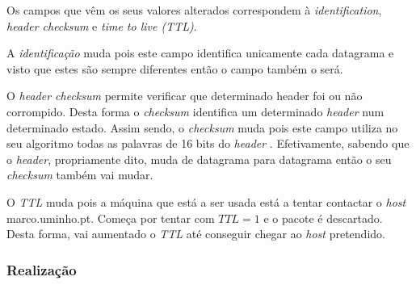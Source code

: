 \documentclass{llncs}
\begin{document}
Os campos que vêm os seus valores alterados correspondem à \textit{identification}, \textit{header checksum} e \textit{time to live (TTL)}. 

A \emph{identificação} muda pois este campo identifica unicamente cada datagrama e visto que estes são sempre diferentes então o campo também o será.

O \textit{header checksum} permite verificar que determinado header foi ou não corrompido. Desta forma o \textit{checksum} identifica um determinado \textit{header} num determinado estado. Assim sendo, o \textit{checksum} muda pois este campo utiliza no seu algoritmo todas as palavras de 16 bits do \textit{header} \cite{rfc792}. Efetivamente, sabendo que o \textit{header}, propriamente dito, muda de datagrama para datagrama então o seu \textit{checksum} também vai mudar.

O \textit{TTL} muda pois a máquina que está a ser usada está a tentar contactar o \textit{host} marco.uminho.pt. Começa por tentar com \(TTL = 1\) e o pacote é descartado. Desta forma, vai aumentado o \textit{TTL} até conseguir chegar ao \textit{host} pretendido.

\subsubsection{Realização}\rule[-10pt]{0pt}{10pt}\\
\end{document}
